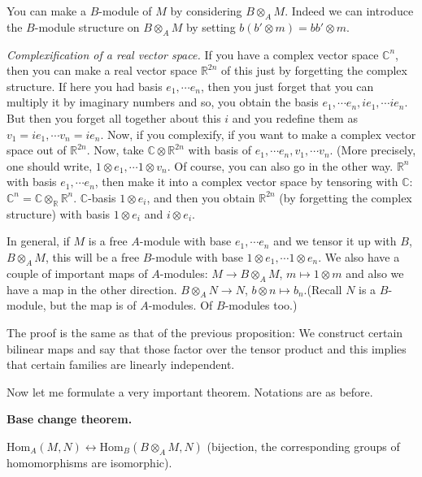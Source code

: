 You can make a $B$-module of $M$ by considering $B \otimes_A M$. Indeed we can introduce the $B$-module structure on $B \otimes_A M$ by setting $b (b'\otimes m)=bb'\otimes m$.  

\begin{example} \textit{Complexification of a real vector space.}
If you have a complex vector space $\mathbb{C}^n$, then you can make a real vector space $\mathbb{R}^{2n}$ of this just by forgetting the complex structure. If here you had basis $e_1,\cdots e_n$, then you just forget that you can multiply it by imaginary numbers and so, you obtain the basis $e_1,\cdots e_n, ie_1,\cdots ie_n$. But then you forget all together about this $i$ and you redefine them as $v_1=ie_1,\cdots v_n=ie_n$. Now, if you complexify, if you want to make a complex vector space out of $\mathbb{R}^{2n}$. Now, take $\mathbb{C} \otimes \mathbb{R}^{2n}$ with basis of $e_1, \cdots e_n, v_1, \cdots v_n$. (More precisely, one should write, $1\otimes e_1, \cdots 1 \otimes v_n$. Of course, you can also go in the other way. $\mathbb{R}^n$ with basis $e_1 , \cdots e_n$, then make it into a complex vector space by tensoring with $\mathbb{C}$: $\mathbb{C}^n=\mathbb{C}\otimes_{\mathbb{R}} \mathbb{R}^n$. $\mathbb{C}$-basis $1 \otimes e_i$, and then you obtain $\mathbb{R}^{2n}$ (by forgetting the complex structure) with basis $1\otimes e_i$ and $i\otimes e_i$. 
\end{example}

In general, if $M$ is a free $A$-module with base $e_1,\cdots e_n$ and we tensor it up with $B$, $B\otimes_A M$, this will be a free $B$-module with base $1\otimes e_1,\cdots 1\otimes e_n$. We also have a couple of important maps of $A$-modules: $M\to B\otimes_A M$, $m\mapsto 1\otimes m$ and also we have a map in the other direction. $B \otimes_A N\to N$, $b\otimes n \mapsto b_n$.(Recall $N$ is a $B$-module, but the map is of $A$-modules. Of $B$-modules too.) 

The proof is the same as that of the previous proposition: We construct certain bilinear maps and say that those factor over the tensor product and this implies that certain families are linearly independent. 

Now let me formulate a very important theorem. Notations are as before.

\begin{theorem} \textbf{Base change theorem.}

$\text{Hom}_A(M,N)\leftrightarrow\text{Hom}_B(B\otimes_A M,N)$ (bijection, the corresponding groups of homomorphisms are isomorphic).
\end{theorem}

